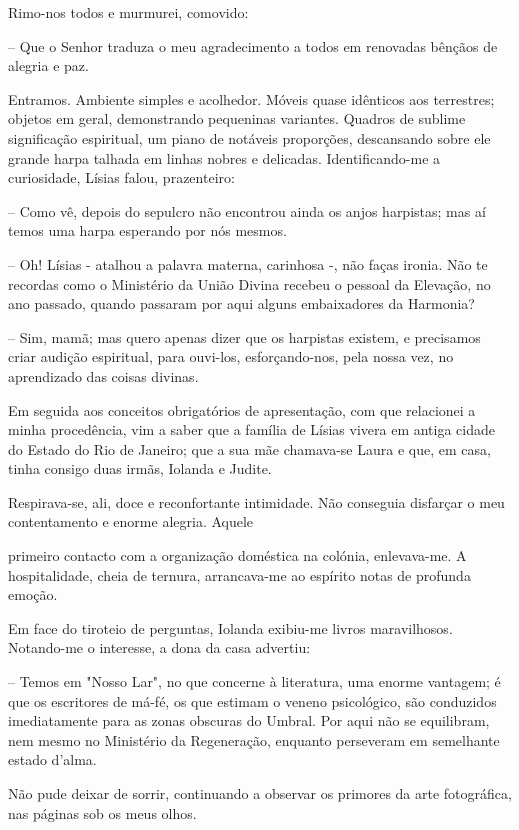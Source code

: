 \documentclass[portuguese,12pt,a4paper]{scrbook}
\begin{document}
	Rimo-nos todos e murmurei, comovido:
	
	– Que o Senhor traduza o meu agradecimento a todos em renovadas bênçãos de alegria e paz.
	
	Entramos. Ambiente simples e acolhedor. Móveis quase idênticos aos terrestres; objetos em geral, demonstrando pequeninas variantes. Quadros de sublime significação espiritual, um piano de notáveis proporções, descansando sobre ele grande harpa talhada em linhas nobres e delicadas. Identificando-me a curiosidade, Lísias falou, prazenteiro:
	
	– Como vê, depois do sepulcro não encontrou ainda os anjos harpistas; mas aí temos uma harpa esperando por nós mesmos.
	
	– Oh! Lísias - atalhou a palavra materna, carinhosa -, não faças ironia. Não te recordas como o Ministério da União Divina recebeu o pessoal da Elevação, no ano passado, quando passaram por aqui alguns embaixadores da Harmonia?
	
	– Sim, mamã; mas quero apenas dizer que os harpistas existem, e precisamos criar audição espiritual, para ouvi-los, esforçando-nos, pela nossa vez, no aprendizado das coisas divinas.
	
	Em seguida aos conceitos obrigatórios de apresentação, com que relacionei a minha procedência, vim a saber que a família de Lísias vivera em antiga cidade do Estado do Rio de Janeiro; que a sua mãe chamava-se Laura e que, em casa, tinha consigo duas irmãs, Iolanda e Judite.
	
	Respirava-se, ali, doce e reconfortante intimidade. Não conseguia disfarçar o meu contentamento e enorme alegria. Aquele
	
	
	primeiro contacto com a organização doméstica na colónia, enlevava-me. A hospitalidade, cheia de ternura, arrancava-me ao espírito notas de profunda emoção.
	
	Em face do tiroteio de perguntas, Iolanda exibiu-me livros maravilhosos. Notando-me o interesse, a dona da casa advertiu:
	
	– Temos em "Nosso Lar", no que concerne à literatura, uma enorme vantagem; é que os escritores de má-fé, os que estimam o veneno psicológico, são conduzidos imediatamente para as zonas obscuras do Umbral. Por aqui não se equilibram, nem mesmo no Ministério da Regeneração, enquanto perseveram em semelhante estado d’alma.
	
	Não pude deixar de sorrir, continuando a observar os primores da arte fotográfica, nas páginas sob os meus olhos.
	
\end{document}
